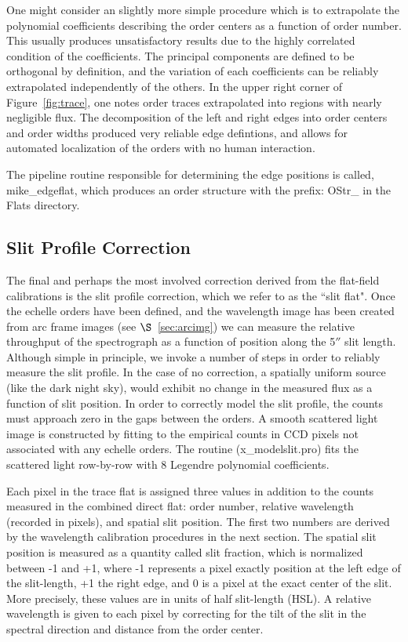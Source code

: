 \documentclass[12pt,preprint]{aastex}
\begin{document}
One might consider an slightly more simple procedure which is to 
extrapolate the polynomial coefficients describing the order centers 
as a function of order number.  
This usually produces unsatisfactory results due to the highly
correlated condition of the coefficients.  The principal components are
defined to be orthogonal by definition, and the variation of each 
coefficients can be reliably extrapolated independently of the others.
In the upper right corner of Figure~\ref{fig:trace}, one notes 
order traces extrapolated into regions with nearly negligible flux.
The decomposition of the left and right edges into order centers and
order widths produced very reliable edge defintions, and 
allows for automated localization of the 
orders with no human interaction.

The pipeline routine responsible for determining the edge positions
is called, mike\_edgeflat, which produces an order structure with the
prefix:  OStr\_ in the Flats directory.

\subsection{Slit Profile Correction}
\label{sec:slitprof}

The final and perhaps the most involved correction derived
from the
flat-field calibrations is the slit profile correction, which we refer
to as the ``slit flat".  Once the echelle orders have been defined, and the
wavelength image has been created from arc frame images 
(see $\S$~\ref{sec:arcimg})
we can measure the relative throughput of the spectrograph as a function of
position along the 5$''$ slit length.  
Although simple in principle, we invoke a number
of steps in order to reliably measure the slit profile.  In the case of no
correction, a spatially uniform source (like the dark night sky), would
exhibit no change in the measured flux as a function of slit position.
In order to correctly model the slit profile, the counts must approach zero
in the gaps between the orders.  A smooth scattered light image is constructed 
by fitting to the empirical counts in CCD pixels not associated with any
echelle orders.  The routine (x\_modelslit.pro)
fits the scattered light row-by-row with 
8 Legendre polynomial coefficients. 

Each pixel in the trace flat is assigned three values in addition to the counts
measured in the combined direct flat:  order number, relative wavelength
(recorded in pixels), and spatial slit position.  
The first two numbers are derived by the wavelength calibration
procedures in the next section.
The spatial slit position is measured as a quantity
called slit fraction, which is normalized between -1 and +1, 
where -1 represents a pixel exactly position at the left edge 
of the slit-length, 
+1 the right edge, and 0 is a pixel at the exact center of the slit.
More precisely, these values are in units of half slit-length (HSL).
A relative wavelength is given to each pixel by correcting for the tilt
of the slit in the spectral direction and distance from the order center.
\end{document}

